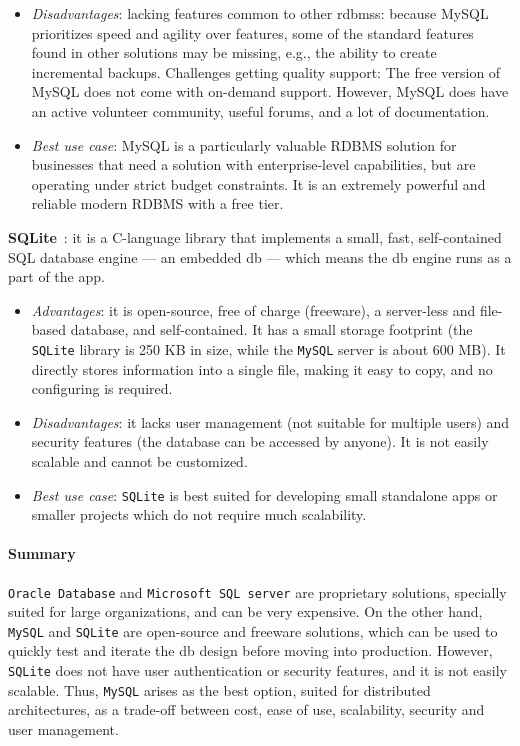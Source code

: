 \begin{item-c}
\begin{itemize}
      highly compatible with many other database systems.
    \item \emph{Disadvantages}: lacking features common to other \glspl{rdbms}:
      because MySQL prioritizes speed and agility over features, some of the
      standard features found in other solutions may be missing, e.g., the
      ability to create incremental backups. Challenges getting quality support:
      The free version of MySQL does not come with on-demand support. However,
      MySQL does have an active volunteer community, useful forums, and a lot of
      documentation.
    \item \emph{Best use case}: MySQL is a particularly valuable RDBMS solution
      for businesses that need a solution with enterprise-level capabilities,
      but are operating under strict budget constraints. It is an extremely
      powerful and reliable modern RDBMS with a free tier.
  \end{itemize}
\item \textbf{SQLite}~\cite{MysqlVsSqlite}: it is a C-language library that
  implements a small, fast, self-contained SQL database engine --- 
  an embedded \gls{db} --- which means the \gls{db} engine runs as a part of the
  app.
    \begin{itemize}
    \item \emph{Advantages}: it is open-source, free of charge (freeware), a
      server-less and file-based database, and self-contained. It has a small
      storage footprint (the \texttt{SQLite} library is 250 KB in size, while the \texttt{MySQL}
      server is about 600 MB). It directly stores information into a single
      file, making it easy to copy, and no configuring is required.
    \item \emph{Disadvantages}: it lacks user management (not suitable for
      multiple users) and security features (the database can be accessed by
      anyone). It is not easily scalable and cannot be customized.
    \item \emph{Best use case}: \texttt{SQLite} is best suited for developing
      small standalone apps or smaller projects which do not require much
      scalability.
  \end{itemize}
\end{item-c}
%
\paragraph{\textbf{Summary}}
\texttt{Oracle Database} and \texttt{Microsoft SQL server} are proprietary
solutions, specially suited for large organizations, and can be very
expensive. On the other hand, \texttt{MySQL} and \texttt{SQLite} are open-source
and freeware solutions, which can be used to quickly test and iterate the
\gls{db} design before moving into production. However, \texttt{SQLite} does not
have user authentication or security features, and it is not easily
scalable. Thus, \texttt{MySQL} arises as the best option, suited for distributed
architectures, as a trade-off between cost, ease of use, scalability, security
and user management.
%
